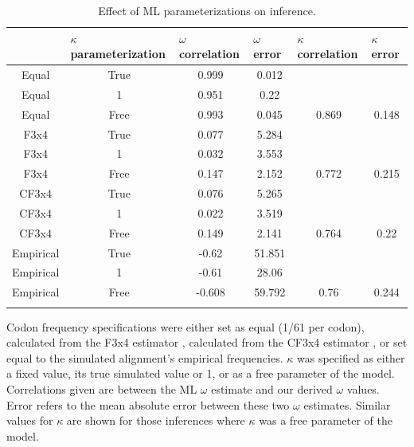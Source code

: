 \documentclass[11pt]{article}
\begin{document}
\begin{table}[htbp]
\caption {\label{tab:mlspec}Effect of ML parameterizations on inference.}
\begin{tabular}{c c c c c c}
\hline\noalign{\smallskip}
\multicolumn{1}{l}{Codon frequencies} & \multicolumn{1}{l}{$\kappa$ parameterization} & \multicolumn{1}{l}{$\omega$ correlation} &\multicolumn{1}{l}{$\omega$ error} & \multicolumn{1}{l}{$\kappa$ correlation} &\multicolumn{1}{l}{$\kappa$ error} \\
\hline\noalign{\smallskip}
Equal & True & 0.999 & 0.012 &   &   \\ 
Equal & 1 & 0.951 & 0.22 &   &   \\ 
Equal & Free & 0.993 & 0.045 & 0.869 & 0.148 \\ 
F3x4 & True & 0.077 & 5.284 &   &   \\ 
F3x4 & 1 & 0.032 & 3.553 &   &   \\ 
F3x4 & Free & 0.147 & 2.152 & 0.772 & 0.215 \\ 
CF3x4 & True & 0.076 & 5.265 &   &   \\ 
CF3x4 & 1 & 0.022 & 3.519 &   &   \\ 
CF3x4 & Free & 0.149 & 2.141 & 0.764 & 0.22 \\ 
Empirical & True & -0.62 & 51.851 &   &   \\ 
Empirical & 1 & -0.61 & 28.06 &   &   \\ 
Empirical & Free & -0.608 & 59.792 & 0.76 & 0.244 \\ 

\noalign{\smallskip}\hline\noalign{\smallskip}
\end{tabular}
\newline
Codon frequency specifications were either set as equal (1/61 per codon), calculated from the F3x4 estimator \cite{MuseGaut1994}, calculated from the CF3x4 estimator \cite{Pond2010}, or set equal to the simulated alignment's empirical frequencies. $\kappa$ was specified as either a fixed value, its true simulated value or 1, or as a free parameter of the model. Correlations given are between the ML $\omega$ estimate and our derived $\omega$ values. Error refers to the mean absolute error between these two $\omega$ estimates. Similar values for $\kappa$ are shown for those inferences where $\kappa$ was a free parameter of the model.
\end{table}	
	
\end{document}
